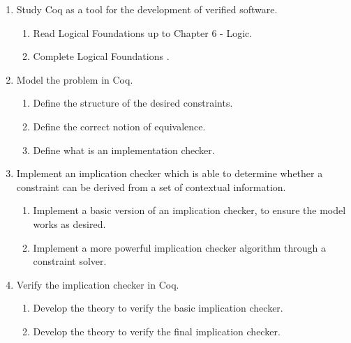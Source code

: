 \begin{enumerate}
    \item Study Coq as a tool for the development of verified software. \\
    \begin{enumerate}[label={1.{\arabic*}.}]
        \item\label{task:1.1} Read Logical Foundations \cite{Pierce2017Logical} up to Chapter 6 - Logic.
        \item\label{task:1.2} Complete Logical Foundations \cite{Pierce2017Logical}.
    \end{enumerate}
    
    \item Model the problem in Coq.
    \begin{enumerate}[label={2.{\arabic*}.}]
        \item\label{task:2.1} Define the structure of the desired constraints.
        \item\label{task:2.2} Define the correct notion of equivalence.
        \item\label{task:2.3} Define what is an implementation checker.
    \end{enumerate}
    
    \item Implement an implication checker which is able to determine whether a constraint can be derived from a set of contextual information.
    \begin{enumerate}[label={3.{\arabic*}.}]
        \item\label{task:3.1} Implement a basic version of an implication checker, to ensure the model works as desired.
        \item\label{task:3.2} Implement a more powerful implication checker algorithm through a constraint solver.
    \end{enumerate}
    
    \item Verify the implication checker in Coq.
    \begin{enumerate}[label={4.{\arabic*}.}]
        \item\label{task:4.1} Develop the theory to verify the basic implication checker.
        \item\label{task:4.2} Develop the theory to verify the final implication checker.
    \end{enumerate}
\end{enumerate}

